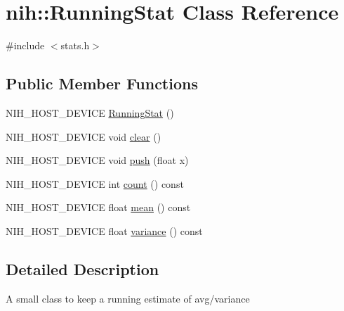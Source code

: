 \hypertarget{classnih_1_1_running_stat}{
\section{nih\-:\-:\-Running\-Stat \-Class \-Reference}
\label{classnih_1_1_running_stat}
}


{\ttfamily \#include $<$stats.\-h$>$}

\subsection*{\-Public \-Member \-Functions}
\begin{DoxyCompactItemize}
\item 
\-N\-I\-H\-\_\-\-H\-O\-S\-T\-\_\-\-D\-E\-V\-I\-C\-E \hyperlink{classnih_1_1_running_stat_a7552ff4ea8100a6c2a4116406d7cb4a4}{\-Running\-Stat} ()
\item 
\-N\-I\-H\-\_\-\-H\-O\-S\-T\-\_\-\-D\-E\-V\-I\-C\-E void \hyperlink{classnih_1_1_running_stat_a089b7318809b0b6465f0cde8bb506a9e}{clear} ()
\item 
\-N\-I\-H\-\_\-\-H\-O\-S\-T\-\_\-\-D\-E\-V\-I\-C\-E void \hyperlink{classnih_1_1_running_stat_a5569aae5076f40ac16889e5b7f5c1564}{push} (float x)
\item 
\-N\-I\-H\-\_\-\-H\-O\-S\-T\-\_\-\-D\-E\-V\-I\-C\-E int \hyperlink{classnih_1_1_running_stat_acad1d887fa5d96d4f44fa22e7d572d67}{count} () const 
\item 
\-N\-I\-H\-\_\-\-H\-O\-S\-T\-\_\-\-D\-E\-V\-I\-C\-E float \hyperlink{classnih_1_1_running_stat_a8785bce54f320d8a74aff13407f70fab}{mean} () const 
\item 
\-N\-I\-H\-\_\-\-H\-O\-S\-T\-\_\-\-D\-E\-V\-I\-C\-E float \hyperlink{classnih_1_1_running_stat_a793cbce3c688d017aa1411b73211fa31}{variance} () const 
\end{DoxyCompactItemize}


\subsection{\-Detailed \-Description}
\-A small class to keep a running estimate of avg/variance 

